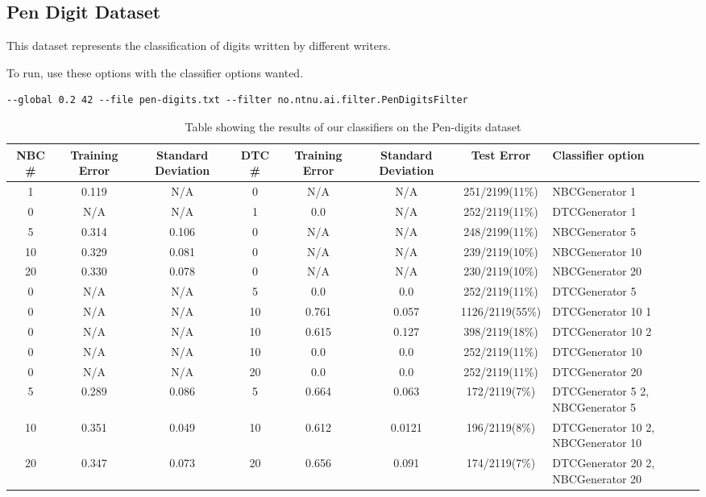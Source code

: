 \subsection{Pen Digit Dataset}\label{pen digit dataset}
This dataset represents the classification of digits written by different writers.

To run, use these options with the classifier options wanted.

\begin{lstlisting}[label=lst:pen, caption=Pen digit dataset general options]
--global 0.2 42 --file pen-digits.txt --filter no.ntnu.ai.filter.PenDigitsFilter
\end{lstlisting}

\begin{landscape}
\begin{table}
\begin{tabular}{|c|c|c||c|c|c||c||p{5cm}|}
\hline
NBC \# & Training Error & Standard Deviation & DTC \# & Training Error
& Standard Deviation & Test Error & Classifier option \\ \hline
1 & 0.119 & N/A & 0 & N/A & N/A & 251/2199(11\%) & NBCGenerator 1 \\ \hline
0 & N/A & N/A & 1 & 0.0 & N/A & 252/2119(11\%) & DTCGenerator 1 \\ \hline
5 & 0.314 & 0.106 & 0 & N/A & N/A & 248/2199(11\%) & NBCGenerator 5 \\ \hline
10 & 0.329 & 0.081 & 0 & N/A & N/A & 239/2119(10\%) & NBCGenerator 10 \\ \hline
20 & 0.330 & 0.078 & 0 & N/A & N/A & 230/2119(10\%) & NBCGenerator 20 \\ \hline
0 & N/A & N/A & 5 & 0.0 & 0.0 & 252/2119(11\%) & DTCGenerator 5 \\ \hline
0 & N/A & N/A & 10 & 0.761 & 0.057 & 1126/2119(55\%) & DTCGenerator 10 1 \\ \hline
0 & N/A & N/A & 10 & 0.615 & 0.127 & 398/2119(18\%) & DTCGenerator 10 2 \\ \hline
0 & N/A & N/A & 10 & 0.0 & 0.0 & 252/2119(11\%) & DTCGenerator 10 \\ \hline
0 & N/A & N/A & 20 & 0.0 & 0.0 & 252/2119(11\%)& DTCGenerator 20 \\ \hline
5 & 0.289 & 0.086 & 5 & 0.664 & 0.063 & 172/2119(7\%) & DTCGenerator 5 2, 
\newline NBCGenerator 5 \\ \hline
10 & 0.351 & 0.049 & 10 & 0.612 & 0.0121 & 196/2119(8\%) & DTCGenerator 10 2, 
\newline NBCGenerator 10 \\ \hline
20 & 0.347 & 0.073 & 20 & 0.656 & 0.091 & 174/2119(7\%) & DTCGenerator 20 2, 
\newline NBCGenerator 20 \\ \hline
\hline
\end{tabular}
\label{tab:pen}
\caption[Pen-digits dataset boosting]{Table showing the results of our 
classifiers on the Pen-digits dataset}
\end{table}
\end{landscape}
